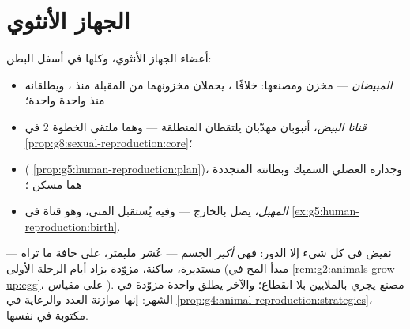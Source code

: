 \section{الجهاز الأنثوي}

\begin{definition}\label{def:g8:reproductive-systems:female}
أعضاء الجهاز الأنثوي، وكلها في أسفل البطن:
\begin{itemize}
  \item \emph{المبيضان} --- مخزن 
        ومصنعها: خلافًا ، يحملان مخزونهما من
        \emph{} المقبلة منذ ، ويطلقانه منذ
         واحدة واحدة؛
  \item \emph{قناتا البيض}، أنبوبان
        مهدّبان يلتقطان  المنطلقة --- وهما ملتقى
        الخطوة 2 في \cref{prop:g8:sexual-reproduction:core}؛
  \item \emph{} ( \cref{prop:g5:human-reproduction:plan})،
        وجداره العضلي السميك وبطانته المتجددة هما مسكن
        ؛
  \item \emph{المهبل}، يصل  بالخارج --- وفيه يُستقبل
        المني، وهو قناة  في
        \cref{ex:g5:human-reproduction:birth}.
\end{itemize}
\end{definition}

\begin{example}\label{ex:g8:reproductive-systems:egg}
 نقيض  في كل شيء إلا الدور: فهي
\emph{أكبر}  الجسم --- عُشر مليمتر، على حافة ما
تراه  --- مستديرة، ساكنة، مزوّدة بزاد أيام الرحلة
الأولى (مبدأ المح في \cref{rem:g2:animals-grow-up:egg}،
على مقياس ). مصنع يجري بالملايين بلا انقطاع؛
والآخر يطلق  واحدة مزوّدة في الشهر: إنها موازنة
العدد والرعاية في
\cref{prop:g4:animal-reproduction:strategies}، مكتوبة في
 نفسها.
\end{example}

